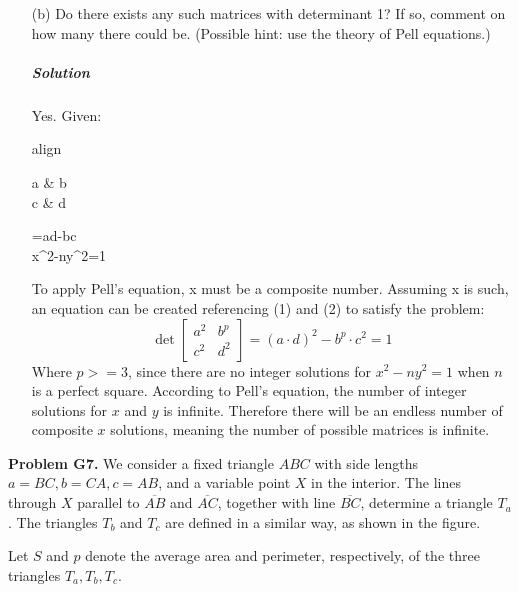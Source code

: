 \documentclass[a4paper]{amsart}
\begin{document}
\begin{flushleft}
\begin{enumerate}
			\item[(b)] Do there exists any such matrices with determinant 1? If so, comment on how many there could be. (Possible hint: use the theory of Pell equations.)
			
			\subparagraph{\textbf{Solution}} Yes. Given:
			
			\begin{empheq}{align}
			 \det\begin{bmatrix} a & b \\ c & d \end{bmatrix}=a\cdot d-b\cdot c \\
			 x^2-ny^2=1
			\end{empheq}
			
			To apply Pell's equation, x must be a composite number. Assuming x is such, an equation can be created referencing (1) and (2) to satisfy the problem:
			\[ \det\begin{bmatrix} a^2 & b^p \\ c^2 & d^2 \end{bmatrix}=(a\cdot d)^2-b^p\cdot c^2=1 \]
			Where $p>=3$, since there are no integer solutions for $x^2-ny^2=1$ when $n$ is a perfect square. According to Pell's equation, the number of integer solutions for $x$ and $y$ is infinite. Therefore there will be an endless number of composite $x$ solutions, meaning the number of possible matrices is infinite.
		\end{enumerate}
	
		\textbf{Problem G7.} We consider a fixed triangle $ABC$ with side lengths $a=BC,b=CA,c=AB$, and a variable point $X$ in the interior. The lines through $X$ parallel to $\overline{AB}$ and $\overline{AC}$, together with line $\overline{BC}$, determine a triangle $T_a$. The triangles $T_b$ and $T_c$ are defined in a similar way, as shown in the figure. 
		\begin{center}
		\end{center}
		Let $S$ and $p$ denote the average area and perimeter, respectively, of the three triangles $T_a,T_b,T_c$.
		

\end{flushleft}
\end{document}
